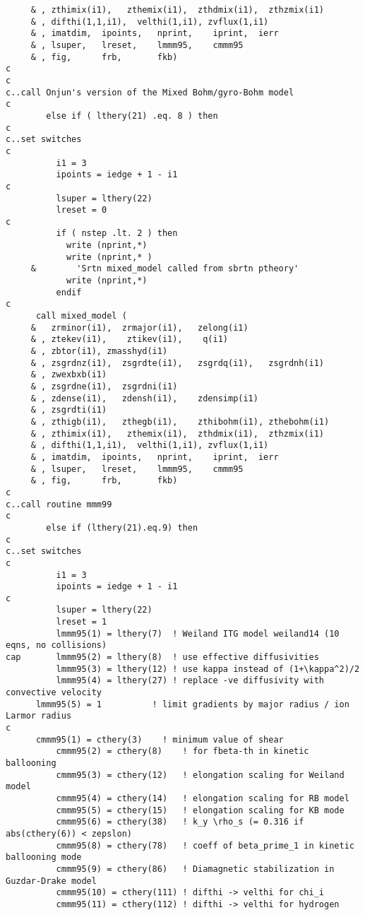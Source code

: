 \begin{verbatim}
     & , zthimix(i1),   zthemix(i1),  zthdmix(i1),  zthzmix(i1)
     & , difthi(1,1,i1),  velthi(1,i1), zvflux(1,i1)
     & , imatdim,  ipoints,   nprint,    iprint,  ierr
     & , lsuper,   lreset,    lmmm95,    cmmm95
     & , fig,      frb,       fkb)
c
c
c..call Onjun's version of the Mixed Bohm/gyro-Bohm model
c
        else if ( lthery(21) .eq. 8 ) then
c
c..set switches
c
          i1 = 3
          ipoints = iedge + 1 - i1
c
          lsuper = lthery(22)
          lreset = 0
c
          if ( nstep .lt. 2 ) then
            write (nprint,*)
            write (nprint,* )
     &        'Srtn mixed_model called from sbrtn ptheory'
            write (nprint,*)
          endif
c
      call mixed_model (
     &   zrminor(i1),  zrmajor(i1),   zelong(i1)
     & , ztekev(i1),    ztikev(i1),    q(i1)
     & , zbtor(i1), zmasshyd(i1)
     & , zsgrdnz(i1),  zsgrdte(i1),   zsgrdq(i1),   zsgrdnh(i1)
     & , zwexbxb(i1)
     & , zsgrdne(i1),  zsgrdni(i1)
     & , zdense(i1),   zdensh(i1),    zdensimp(i1)
     & , zsgrdti(i1)
     & , zthigb(i1),   zthegb(i1),    zthibohm(i1), zthebohm(i1)
     & , zthimix(i1),   zthemix(i1),  zthdmix(i1),  zthzmix(i1)
     & , difthi(1,1,i1),  velthi(1,i1), zvflux(1,i1)
     & , imatdim,  ipoints,   nprint,    iprint,  ierr
     & , lsuper,   lreset,    lmmm95,    cmmm95
     & , fig,      frb,       fkb)
c
c..call routine mmm99
c
        else if (lthery(21).eq.9) then
c
c..set switches
c
          i1 = 3
          ipoints = iedge + 1 - i1
c
          lsuper = lthery(22)
          lreset = 1
          lmmm95(1) = lthery(7)  ! Weiland ITG model weiland14 (10 eqns, no collisions)
cap       lmmm95(2) = lthery(8)  ! use effective diffusivities
          lmmm95(3) = lthery(12) ! use kappa instead of (1+\kappa^2)/2
          lmmm95(4) = lthery(27) ! replace -ve diffusivity with convective velocity
	  lmmm95(5) = 1          ! limit gradients by major radius / ion Larmor radius
c
	  cmmm95(1) = cthery(3)    ! minimum value of shear
          cmmm95(2) = cthery(8)    ! for fbeta-th in kinetic ballooning
          cmmm95(3) = cthery(12)   ! elongation scaling for Weiland model
          cmmm95(4) = cthery(14)   ! elongation scaling for RB model
          cmmm95(5) = cthery(15)   ! elongation scaling for KB mode
          cmmm95(6) = cthery(38)   ! k_y \rho_s (= 0.316 if abs(cthery(6)) < zepslon)
          cmmm95(8) = cthery(78)   ! coeff of beta_prime_1 in kinetic ballooning mode
          cmmm95(9) = cthery(86)   ! Diamagnetic stabilization in Guzdar-Drake model
          cmmm95(10) = cthery(111) ! difthi -> velthi for chi_i
          cmmm95(11) = cthery(112) ! difthi -> velthi for hydrogen

\end{verbatim}
